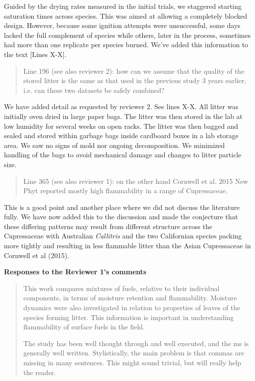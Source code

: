 \documentclass[letterpaper, 12pt]{letter}
\begin{document}
\begin{letter}{}
Guided by the drying rates measured in the initial trials, we staggered starting saturation times across species. This was aimed at allowing a completely blocked design. However, because some ignition attempts were unsuccessful, some days lacked the full complement of species while others, later in the process, sometimes had more than one replicate per species burned. We've added this information to the text [Lines X-X].

\begin{quote}
Line 196 (see also reviewer 2): how can we assume that the quality of the stored litter is the same as that used in the previous study 3 years earlier, i.e. can these two datasets be safely combined?
\end{quote}

We have added detail as requested by reviewer 2. See lines X-X. All litter was
initially oven dried in large paper bags. The litter was then stored in the lab
at low humidity for several weeks on open racks. The litter was then bagged and
sealed and stored within garbage bags inside cardboard boxes in a lab storage
area. We saw no signs of mold nor ongoing decomposition. We minimized handling
of the bags to avoid mechanical damage and changes to litter particle size.


\begin{quote}
Line 365 (see also reviewer 1): on the other hand Cornwell et al. 2015 New Phyt reported mostly high flammability in a range of Cupressaceae.
\end{quote}

This is a good point and another place where we did not discuss the literature fully. We
have now added this to the discussion and made the conjecture that these
differing patterns may result from different structure across the
Cupressaceae with Australian \emph{Callitris} and the two Californian species
packing more tightly and resulting in less flammable litter than the Asian
Cupressaceae in Cornwell et al (2015).


{\bf Responses to the Reviewer 1's comments}

\begin{quote}
This work compares mixtures of fuels, relative to their individual components, in terms of moisture retention and flammability. Moisture dynamics were also investigated in relation to properties of leaves of the species forming litter. This information is important in understanding flammability of surface fuels in the field. 

The study has been well thought through and well executed, and the ms is generally well written. Stylistically, the main problem is that commas are missing in many sentences. This might sound trivial, but will really help the reader.
\end{quote}


\end{letter}
\end{document}
